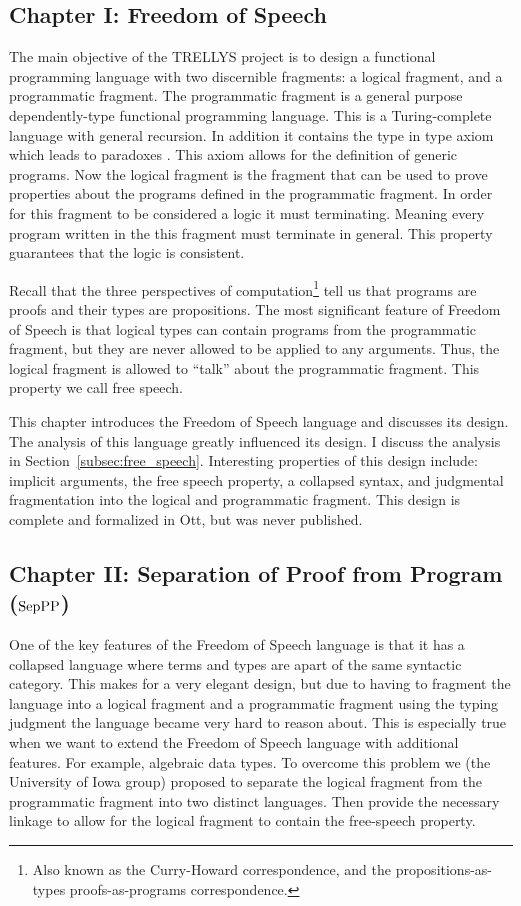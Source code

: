 \subsection{Chapter I: Freedom of Speech}
\label{subsec:freedom_of_speech}
The main objective of the TRELLYS project is to design a functional
programming language with two discernible fragments: a logical
fragment, and a programmatic fragment.  The programmatic fragment is a
general purpose dependently-type functional programming language.
This is a Turing-complete language with general recursion.  In
addition it contains the type in type axiom which leads to paradoxes
\cite{Coquand:1986,Coquand:1994}.  This axiom allows for the
definition of generic programs.  Now the logical fragment is the
fragment that can be used to prove properties about the programs
defined in the programmatic fragment.  In order for this fragment to
be considered a logic it must terminating.  Meaning every program
written in the this fragment must terminate in general.  This property
guarantees that the logic is consistent.

Recall that the three perspectives of computation\footnote{Also known
  as the Curry-Howard correspondence, and the propositions-as-types
  proofs-as-programs correspondence.} tell us that programs are proofs
and their types are propositions.  The most significant feature of
Freedom of Speech is that logical types can contain programs from the
programmatic fragment, but they are never allowed to be applied to any
arguments.  Thus, the logical fragment is allowed to ``talk'' about
the programmatic fragment.  This property we call free speech.

This chapter introduces the Freedom of Speech language and discusses
its design.  The analysis of this language greatly influenced its
design.  I discuss the analysis in
Section~\ref{subsec:free_speech}.  Interesting properties of this
design include: implicit arguments, the free speech property, a
collapsed syntax, and judgmental fragmentation into the logical and
programmatic fragment.  This design is complete and formalized in Ott,
but was never published.

\subsection{Chapter II: Separation of Proof from Program ($\text{SepPP}$) }
\label{subsec:separation_of_proof_from_program}
One of the key features of the Freedom of Speech language is that it
has a collapsed language where terms and types are apart of the same
syntactic category.  This makes for a very elegant design, but due to
having to fragment the language into a logical fragment and a
programmatic fragment using the typing judgment the language became
very hard to reason about.  This is especially true when we want to
extend the Freedom of Speech language with additional features.  For
example, algebraic data types.  To overcome this problem we (the
University of Iowa group) proposed to separate the logical fragment
from the programmatic fragment into two distinct languages. Then
provide the necessary linkage to allow for the logical fragment to
contain the free-speech property.

